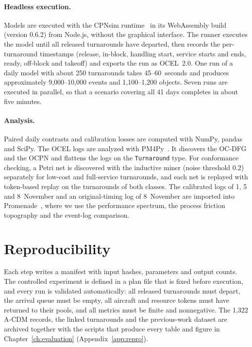 \paragraph{Headless execution.}
Models are executed with the CPNsim runtime~\cite{cpnsim} in its WebAssembly build (version 0.6.2) from Node.js, without the graphical interface. The runner executes the model until all released turnarounds have departed, then records the per-turnaround timestamps (release, in-block, handling start, service starts and ends, ready, off-block and takeoff) and exports the run as OCEL~2.0. One run of a daily model with about 250 turnarounds takes 45--60~seconds and produces approximately 9,000--10,000 events and 1,100--1,200 objects. Seven runs are executed in parallel, so that a scenario covering all 41 days completes in about five minutes.

\paragraph{Analysis.}
Paired daily contrasts and calibration losses are computed with NumPy, pandas and SciPy. The OCEL logs are analyzed with PM4Py~\cite{berti2023pm4py}. It discovers the OC-DFG and the OCPN and flattens the logs on the \texttt{Turnaround} type. For conformance checking, a Petri net is discovered with the inductive miner (noise threshold 0.2) separately for low-cost and full-service turnarounds, and each net is replayed with token-based replay on the turnarounds of both classes. The calibrated logs of 1, 5 and 8~November and an original-timing log of 8~November are imported into Promenade~\cite{promenade}, where we use the performance spectrum, the process friction topography and the event-log comparison.

\section{Reproducibility}

Each step writes a manifest with input hashes, parameters and output counts. The controlled experiment is defined in a plan file that is fixed before execution, and every run is validated automatically: all released turnarounds must depart, the arrival queue must be empty, all aircraft and resource tokens must have returned to their pools, and all metrics must be finite and nonnegative. The 1,322 A-CDM records, the linked turnarounds and the previous-work dataset are archived together with the scripts that produce every table and figure in Chapter~\ref{ch:evaluation} (Appendix~\ref{app:repro}).


